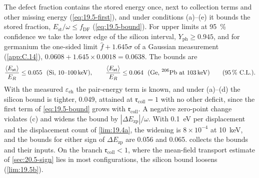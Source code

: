 The defect fraction contains the stored energy once, next to collection terms and other missing energy (\cref{eq:19.5-first}), and under conditions (a)--(e) it bounds the stored fraction, $E_{\mathrm{st}}/\omega \le f_{\mathrm{DF}}$ (\cref{eq:19.5-bound}). For upper limits at \SI{95}{\percent} confidence we take the lower edge of the silicon interval, $Y_{\mathrm{ph}} \ge 0.945$, and for germanium the one-sided limit $\hat f + 1.645\sigma$ of a Gaussian measurement (\cref{app:C.14}), $0.0608 + 1.645\times0.0018 = 0.0638$. The bounds are
\begin{equation*}
  \frac{\langle E_{\mathrm{st}}\rangle}{E_R} \le 0.055\ \ (\text{Si, 10--\SI{100}{keV}}) , \qquad
  \frac{\langle E_{\mathrm{st}}\rangle}{E_R} \le 0.064\ \ (\text{Ge, }^{206}\text{Pb at \SI{103}{keV}}) \qquad (\SI{95}{\percent}\ \text{C.L.}) .
\end{equation*}
With the measured $\varepsilon_{\mathrm{eh}}$ the pair-energy term is known, and under (a)--(d) the silicon bound is tighter, 0.049, attained at $\mathfrak{r}_{\mathrm{coll}} = 1$ with no other deficit, since the first term of \cref{eq:19.5-bound} grows with $\mathfrak{r}_{\mathrm{coll}}$. A negative zero-point change violates (c) and widens the bound by $|\Delta E_{\mathrm{zp}}|/\omega$. With \SI{0.1}{eV} per displacement and the displacement count of \cref{lim:19.4a}, the widening is $8\times10^{-4}$ at \SI{10}{keV}, and the bounds for either sign of $\Delta E_{\mathrm{zp}}$ are 0.056 and 0.065.  collects the bounds and their inputs. On the branch $\mathfrak{r}_{\mathrm{coll}} < 1$, where the mean-field transport estimate of \cref{sec:20.5-sign} lies in most configurations, the silicon bound loosens (\cref{lim:19.5b}).

